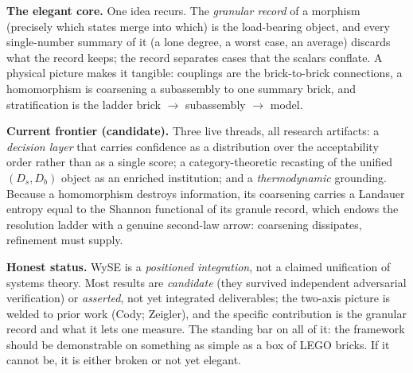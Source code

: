 \documentclass[10pt]{article}
\begin{document}
\textbf{The elegant core.} One idea recurs. The \emph{granular record} of a morphism (precisely which states merge into which) is the load-bearing object, and every single-number summary of it (a lone degree, a worst case, an average) discards what the record keeps; the record separates cases that the scalars conflate. A physical picture makes it tangible: couplings are the brick-to-brick connections, a homomorphism is coarsening a subassembly to one summary brick, and stratification is the ladder brick $\to$ subassembly $\to$ model.

\textbf{Current frontier (candidate).} Three live threads, all research artifacts: a \emph{decision layer} that carries confidence as a distribution over the acceptability order rather than as a single score; a category-theoretic recasting of the unified $(D_s, D_b)$ object as an enriched institution; and a \emph{thermodynamic} grounding. Because a homomorphism destroys information, its coarsening carries a Landauer entropy equal to the Shannon functional of its granule record, which endows the resolution ladder with a genuine second-law arrow: coarsening dissipates, refinement must supply.

\textbf{Honest status.} WySE is a \emph{positioned integration}, not a claimed unification of systems theory. Most results are \emph{candidate} (they survived independent adversarial verification) or \emph{asserted}, not yet integrated deliverables; the two-axis picture is welded to prior work (Cody; Zeigler), and the specific contribution is the granular record and what it lets one measure. The standing bar on all of it: the framework should be demonstrable on something as simple as a box of LEGO bricks. If it cannot be, it is either broken or not yet elegant.
\end{document}

